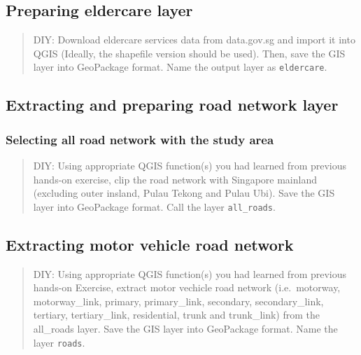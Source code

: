 \documentclass[
  letterpaper,
  DIV=11,
  numbers=noendperiod]{scrreprt}
\begin{document}
\hypertarget{preparing-eldercare-layer-1}{%
\subsection{Preparing eldercare
layer}\label{preparing-eldercare-layer-1}}

\begin{quote}
DIY: Download eldercare services data from data.gov.sg and import it
into QGIS (Ideally, the shapefile version should be used). Then, save
the GIS layer into GeoPackage format. Name the output layer as
\texttt{eldercare}.
\end{quote}

\hypertarget{extracting-and-preparing-road-network-layer-1}{%
\subsection{Extracting and preparing road network
layer}\label{extracting-and-preparing-road-network-layer-1}}

\hypertarget{selecting-all-road-network-with-the-study-area-1}{%
\subsubsection{Selecting all road network with the study
area}\label{selecting-all-road-network-with-the-study-area-1}}

\begin{quote}
DIY: Using appropriate QGIS function(s) you had learned from previous
hands-on exercise, clip the road network with Singapore mainland
(excluding outer insland, Pulau Tekong and Pulau Ubi). Save the GIS
layer into GeoPackage format. Call the layer \texttt{all\_roads}.
\end{quote}

\hypertarget{extracting-motor-vehicle-road-network-1}{%
\subsection{Extracting motor vehicle road
network}\label{extracting-motor-vehicle-road-network-1}}

\begin{quote}
DIY: Using appropriate QGIS function(s) you had learned from previous
hands-on Exercise, extract motor vechicle road network (i.e.~motorway,
motorway\_link, primary, primary\_link, secondary, secondary\_link,
tertiary, tertiary\_link, residential, trunk and trunk\_link) from the
all\_roads layer. Save the GIS layer into GeoPackage format. Name the
layer \texttt{roads}.
\end{quote}
\end{document}
